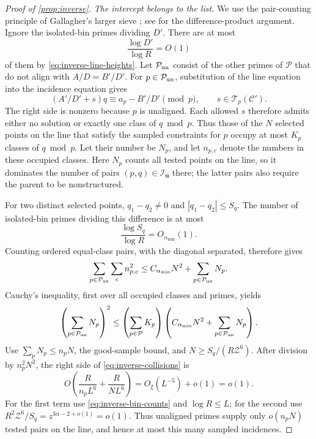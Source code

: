 \begin{proof}[Proof of \cref{prop:inverse}]
\medskip
\emph{The intercept belongs to the list.}
We use the pair-counting principle of Gallagher's larger sieve
\cite{Gallagher1971}; see \cite[Section~2]{HelfgottVenkatesh2009} for
the difference-product argument.
Ignore the isolated-bin primes dividing \(D'\).
There are at most
\[
 \frac{\log D'}{\log R}=O(1)
\]
of them by \eqref{eq:inverse-line-heights}.
Let \(\mathcal P_{\rm un}\) consist of the other primes of
\(\mathcal P\) that do not align with \(A/D=B'/D'\).
For \(p\in\mathcal P_{\rm un}\), substitution of the line equation
into the incidence equation gives
\[
 (A'/D'+s)q\equiv a_p-B'/D'\pmod p,
 \qquad s\in\mathcal T_p(\mathcal C').
 \]
The right side is nonzero because \(p\) is unaligned.
Each allowed \(s\) therefore admits either no solution or exactly one
class of \(q\bmod p\).
Thus those of the \(N\) selected points on the line that satisfy the
sampled constraints for \(p\) occupy at most \(K_p\) classes of \(q\bmod p\).
Let their number be \(N_p\), and let \(n_{p,c}\) denote the numbers
in these occupied classes. Here \(N_p\) counts all tested points on the
line, so it dominates the number of pairs
\((p,q)\in\mathcal I_{\mathbf u}\) there; the latter pairs also require
the parent to be nonstructured.

For two distinct selected points, \(q_1-q_2\ne0\) and
\(|q_1-q_2|\le S_q\).
The number of isolated-bin primes dividing this difference is at
most
\[
 \frac{\log S_q}{\log R}=O_{\alpha_{\min}}(1).
\]
Counting ordered equal-class pairs, with the diagonal separated,
therefore gives
\[
 \sum_{p\in\mathcal P_{\rm un}}\sum_c n_{p,c}^2
 \le C_{\alpha_{\min}}N^2+
       \sum_{p\in\mathcal P_{\rm un}}N_p.
\]
Cauchy's inequality, first over all occupied classes and primes,
yields
\begin{equation}
 \left(\sum_{p\in\mathcal P_{\rm un}}N_p\right)^2
 \le
 \left(\sum_{p\in\mathcal P}K_p\right)
 \left(C_{\alpha_{\min}}N^2+
             \sum_{p\in\mathcal P_{\rm un}}N_p\right).
 \label{eq:inverse-collisions}
\end{equation}
Use \(\sum_p N_p\le n_pN\), the good-sample bound, and
\(N\ge S_q/(R\mathcal Z^6)\).
After division by \(n_p^2N^2\), the right side of
\eqref{eq:inverse-collisions} is
\begin{equation}
 O\!\left(\frac{R}{n_pL^6}+\frac{R}{NL^6}\right)
 =O_\xi(L^{-5})+o(1)=o(1).
 \label{eq:inverse-collision-normalization}
\end{equation}
For the first term use \eqref{eq:inverse-bin-counts} and
\(\log R\le L\); for the second use
\(R^2\mathcal Z^6/S_q=z^{3\alpha-2+o(1)}=o(1)\).
Thus unaligned primes supply only \(o(n_pN)\) tested pairs on the line,
and hence at most this many sampled incidences.


\end{proof}
